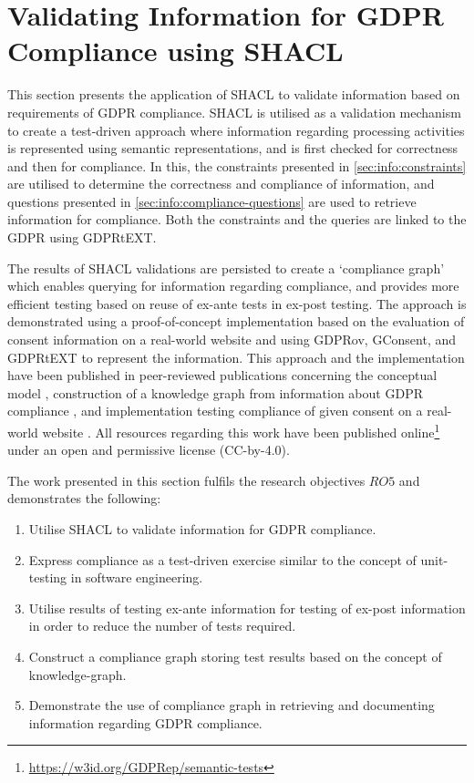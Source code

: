 
\section{Validating Information for GDPR Compliance using SHACL}\label{sec:testing:shacl}
This section presents the application of SHACL to validate information based on requirements of GDPR compliance.
SHACL is utilised as a validation mechanism to create a test-driven approach where information regarding processing activities is represented using semantic representations, and is first checked for correctness and then for compliance.
In this, the constraints presented in \autoref{sec:info:constraints} are utilised to determine the correctness and compliance of information, and questions presented in \autoref{sec:info:compliance-questions} are used to retrieve information for compliance.
Both the constraints and the queries are linked to the GDPR using GDPRtEXT.

The results of SHACL validations are persisted to create a `compliance graph' which enables querying for information regarding compliance, and provides more efficient testing based on reuse of ex-ante tests in ex-post testing.
The approach is demonstrated using a proof-of-concept implementation based on the evaluation of consent information on a real-world website and using GDPRov, GConsent, and GDPRtEXT to represent the information.
This approach and the implementation have been published in peer-reviewed publications concerning the conceptual model \cite{pandit_exploring_2018}, construction of a knowledge graph from information about GDPR compliance \cite{pandit_towards_2018}, and implementation testing compliance of given consent on a real-world website \cite{pandit_test-driven_2019}.
All resources regarding this work have been published online\footnote{\url{https://w3id.org/GDPRep/semantic-tests}} under an open and permissive license (CC-by-4.0).

The work presented in this section fulfils the research objectives $RO5$ and demonstrates the following:
\begin{enumerate}
    \item Utilise SHACL to validate information for GDPR compliance.
    \item Express compliance as a test-driven exercise similar to the concept of unit-testing in software engineering.
    \item Utilise results of testing ex-ante information for testing of ex-post information in order to reduce the number of tests required.
    \item Construct a compliance graph storing test results based on the concept of knowledge-graph.
    \item Demonstrate the use of compliance graph in retrieving and documenting information regarding GDPR compliance.
\end{enumerate}

